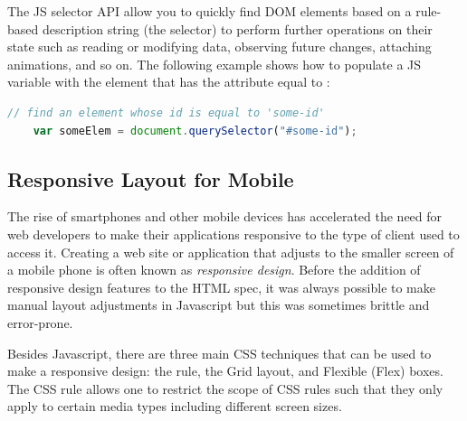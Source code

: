 The JS selector API allow you to quickly find DOM elements based on a rule-based description string (the selector) to perform further operations on their state such as reading or modifying data, observing future changes, attaching animations, and so on. 
The following example shows how to populate a JS variable with the element that has the  attribute equal to :

\begin{lstlisting}[language=JavaScript,numbers=none]
	// find an element whose id is equal to 'some-id'
	var someElem = document.querySelector("#some-id");
\end{lstlisting}










\subsection{Responsive Layout for Mobile}

The rise of smartphones and other mobile devices has accelerated the need for web developers to make their applications responsive to the type of client used to access it.
Creating a web site or application that adjusts to the smaller screen of a mobile phone is often known as \textit{responsive design}.
Before the addition of responsive design features to the HTML spec, 
it was always possible to make manual layout adjustments in Javascript but this was sometimes brittle and error-prone.

Besides Javascript, there are three main CSS techniques that can be used to make a responsive design: 
the  rule, 
the Grid layout, 
and Flexible (Flex) boxes.
The CSS  rule allows one to restrict the scope of CSS rules such that they only apply to certain media types including different screen sizes.

